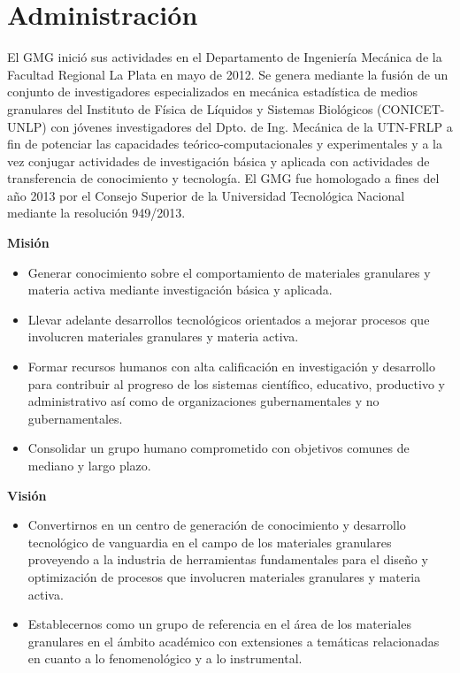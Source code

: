 \documentclass[a4paper,11pt,twoside,final,titlepage,onecolumn,openright]{report}
\begin{document}
\tableofcontents

\chapter{Administración}

El GMG inició sus actividades en el Departamento de Ingeniería Mecánica de la Facultad Regional La Plata en mayo de 2012. Se genera mediante la fusión de un conjunto de investigadores especializados en mecánica estadística de medios granulares del Instituto de Física de Líquidos y Sistemas Biológicos (CONICET-UNLP) con jóvenes investigadores del Dpto. de Ing. Mecánica de la UTN-FRLP a fin de potenciar las capacidades teórico-computacionales y experimentales y a la vez conjugar actividades de investigación básica y aplicada con actividades de transferencia de conocimiento y tecnología. El GMG fue homologado a fines del año 2013 por el Consejo Superior de la Universidad Tecnológica Nacional mediante la resolución 949/2013.
		
\vspace{0.5cm}
{\bf Misión}

\begin{itemize}
 \item Generar conocimiento sobre el comportamiento de materiales granulares y materia activa mediante investigación básica y aplicada.
 \item Llevar adelante desarrollos tecnológicos orientados a mejorar procesos que involucren materiales granulares y materia activa.
 \item Formar recursos humanos con alta calificación en investigación y desarrollo para contribuir al progreso de los sistemas científico, educativo, productivo y administrativo así como de organizaciones gubernamentales y no gubernamentales.
 \item Consolidar un grupo humano comprometido con objetivos comunes de mediano y largo plazo.
\end{itemize}

\vspace{0.5cm}
{\bf Visión}

\begin{itemize}
 \item Convertirnos en un centro de generación de conocimiento y desarrollo tecnológico de vanguardia en el campo de los materiales granulares proveyendo a la industria de herramientas fundamentales para el diseño y optimización de procesos que involucren materiales granulares y materia activa.
 \item Establecernos como un grupo de referencia en el área de los materiales granulares en el ámbito académico con extensiones a temáticas relacionadas en cuanto a lo fenomenológico y a lo instrumental.
\end{itemize}
\end{document}
